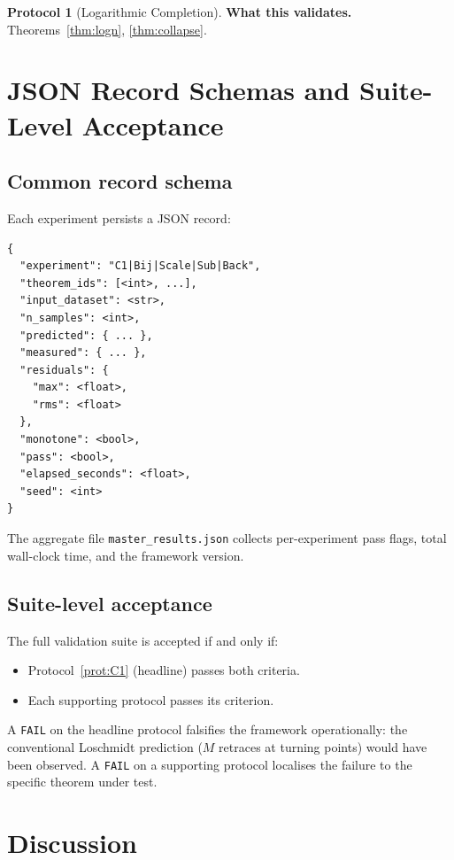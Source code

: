 \documentclass[twocolumn,10pt,a4paper]{article}
\theoremstyle{thmstyle}
\theoremstyle{definition}
\newtheorem{protocol}[theorem]{Protocol}
\theoremstyle{remark}
\begin{document}
\begin{protocol}[Logarithmic Completion]
\textbf{What this validates.} Theorems~\ref{thm:logn}, \ref{thm:collapse}.
\end{protocol}

\section{JSON Record Schemas and Suite-Level Acceptance}
\label{sec:json}

\subsection{Common record schema}

Each experiment persists a JSON record:
\begin{verbatim}
{
  "experiment": "C1|Bij|Scale|Sub|Back",
  "theorem_ids": [<int>, ...],
  "input_dataset": <str>,
  "n_samples": <int>,
  "predicted": { ... },
  "measured": { ... },
  "residuals": {
    "max": <float>,
    "rms": <float>
  },
  "monotone": <bool>,
  "pass": <bool>,
  "elapsed_seconds": <float>,
  "seed": <int>
}
\end{verbatim}

The aggregate file \texttt{master\_results.json} collects per-experiment
pass flags, total wall-clock time, and the framework version.

\subsection{Suite-level acceptance}

The full validation suite is accepted if and only if:
\begin{itemize}[nosep,leftmargin=*]
\item Protocol~\ref{prot:C1} (headline) passes both criteria.
\item Each supporting protocol passes its criterion.
\end{itemize}

A \texttt{FAIL} on the headline protocol falsifies the framework
operationally: the conventional Loschmidt prediction
($M$ retraces at turning points) would have been observed. A
\texttt{FAIL} on a supporting protocol localises the failure to the
specific theorem under test.

\section{Discussion}
\label{sec:discussion}
\end{document}
